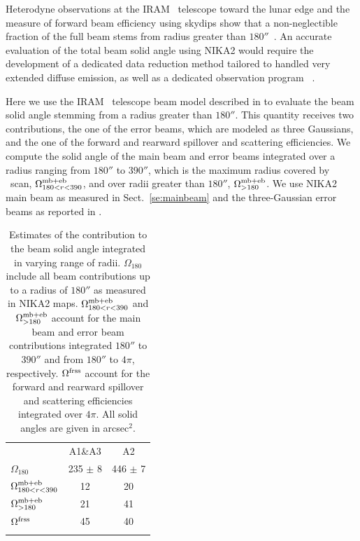 Heterodyne observations at the IRAM \trentemetre\ telescope
toward the lunar edge and the measure of forward beam efficiency using
skydips show that a non-neglectible fraction of the full beam stems
from radius greater than $180''$~\citep{Greve1998, Kramer2013}.
An accurate evaluation of the total beam solid angle using NIKA2 would require
{\lp the development of a dedicated data reduction method tailored to
handled very extended diffuse emission,} as well as a 
dedicated observation program
~\citep{Greve1998, Sugimoto2004, Gusten2006}.
{\lp Here we use the IRAM \trentemetre\ telescope beam model described
in \citet{Kramer2013} to evaluate the beam solid angle stemming from a
radius greater than $180''$.
This quantity receives two contributions, the one of the error beams,
which are modeled as three Gaussians, and the one of the forward and
rearward spillover and scattering efficiencies. We compute the solid
angle of the main beam and error beams integrated over a radius ranging
from $180''$ to $390''$, which is the maximum radius covered by \bm\ scan,
$\Omega_{180<r<390}^{\rm{mb+eb}}$, and over radii greater
than $180''$, $\Omega_{>180}^{\rm{mb+eb}}$. We use NIKA2 main beam as
measured in Sect.~\ref{se:mainbeam} and the three-Gaussian error beams
as reported in \citet{Kramer2013}.  
%
\begin{table}[!h]
\caption{Estimates of the contribution to the beam solid angle
integrated in varying range of radii. $\Omega_{180}$ include all beam
contributions up to a radius of $180''$ as measured in NIKA2
maps. $\Omega_{180<r<390}^{\rm{mb+eb}}$ and
$\Omega_{>180}^{\rm{mb+eb}}$ account for the main beam and error beam
contributions integrated $180''$ to $390''$ and from $180''$ to
$4\pi$, respectively. $\Omega^{\rm{frss}}$ account for the forward and
rearward spillover and scattering efficiencies integrated over
$4\pi$. All solid angles are given in arcsec$^{2}$. }
\label{tab:solid_corr}
\centering
\begin{tabular}{lcc}
\hline\hline
\noalign{\smallskip}
&  A1\&A3 & A2 \\
\noalign{\smallskip}
\hline
\noalign{\smallskip}
$\Omega_{180}$                  &   235 $\pm$  8 & 446 $\pm$  7 \\\noalign{\smallskip}
$\Omega_{180<r<390}^{\rm{mb+eb}}$  &   12          &   20       \\\noalign{\smallskip}
$\Omega_{>180}^{\rm{mb+eb}}$      &   21          &   41      \\\noalign{\smallskip}
$\Omega^{\rm{frss}}$             &   45          &   40      \\
\noalign{\smallskip}
\hline
\end{tabular}
\end{table}
}
